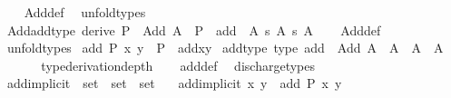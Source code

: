 \begin{isabellebody}
%
\isadelimproof
\ \ %
\endisadelimproof
%
\isatagproof
{}\isamarkupfalse%
\ Add{\isacharunderscore}{\kern0pt}def\ \isamarkupfalse%
\ unfold{\isacharunderscore}{\kern0pt}types%
\endisatagproof
{\isafoldproof}%
%
\isadelimproof
\isanewline
%
\endisadelimproof
\isanewline
{}\isamarkupfalse%
\ Add{\isacharunderscore}{\kern0pt}add{\isacharunderscore}{\kern0pt}type\ {\isacharbrackleft}{\kern0pt}derive{\isacharbrackright}{\kern0pt}{\isacharcolon}{\kern0pt}\ {\isachardoublequoteopen}P\ {\isacharcolon}{\kern0pt}\ Add\ A\ {\isasymLongrightarrow}\ P\ {\isacharat}{\kern0pt}{\isacharat}{\kern0pt}\ add\ {\isacharcolon}{\kern0pt}\ A\ {\isasymrightarrow}s\ A\ {\isasymrightarrow}s\ A{\isachardoublequoteclose}\isanewline
%
\isadelimproof
\ \ %
\endisadelimproof
%
\isatagproof
{}\isamarkupfalse%
\ Add{\isacharunderscore}{\kern0pt}def\ \isamarkupfalse%
\ unfold{\isacharunderscore}{\kern0pt}types%
\endisatagproof
{\isafoldproof}%
%
\isadelimproof
\isanewline
%
\endisadelimproof
\isanewline
{}\isamarkupfalse%
\ {\isachardoublequoteopen}add\ P\ x\ y\ {\isasymequiv}\ {\isacharparenleft}{\kern0pt}P\ {\isacharat}{\kern0pt}{\isacharat}{\kern0pt}\ add{\isacharparenright}{\kern0pt}{\isacharbackquote}{\kern0pt}x{\isacharbackquote}{\kern0pt}y{\isachardoublequoteclose}\isanewline
\isanewline
{}\isamarkupfalse%
\ add{\isacharunderscore}{\kern0pt}type\ {\isacharbrackleft}{\kern0pt}type{\isacharbrackright}{\kern0pt}{\isacharcolon}{\kern0pt}\ {\isachardoublequoteopen}add\ {\isacharcolon}{\kern0pt}\ Add\ A\ {\isasymRightarrow}\ A\ {\isasymRightarrow}\ A\ {\isasymRightarrow}\ A{\isachardoublequoteclose}\isanewline
\ \ \isanewline
%
\isadelimproof
\ \ %
\endisadelimproof
%
\isatagproof
{}\isamarkupfalse%
\ {\isacharbrackleft}{\kern0pt}{\isacharbrackleft}{\kern0pt}type{\isacharunderscore}{\kern0pt}derivation{\isacharunderscore}{\kern0pt}depth{\isacharequal}{\kern0pt}{}{\isacharbrackright}{\kern0pt}{\isacharbrackright}{\kern0pt}\isanewline
\ \ \isamarkupfalse%
\ add{\isacharunderscore}{\kern0pt}def\ \isamarkupfalse%
\ discharge{\isacharunderscore}{\kern0pt}types%
\endisatagproof
{\isafoldproof}%
%
\isadelimproof
\isanewline
%
\endisadelimproof
\isanewline
{}\isamarkupfalse%
\ add{\isacharunderscore}{\kern0pt}implicit\ {\isacharcolon}{\kern0pt}{\isacharcolon}{\kern0pt}\ {\isachardoublequoteopen}set\ {\isasymRightarrow}\ set\ {\isasymRightarrow}\ set{\isachardoublequoteclose}\isanewline
\ \ \ {\isachardoublequoteopen}add{\isacharunderscore}{\kern0pt}implicit\ x\ y\ {\isasymequiv}\ add\ {\isasymimplicit}P\ x\ y{\isachardoublequoteclose}\isanewline

\end{isabellebody}
